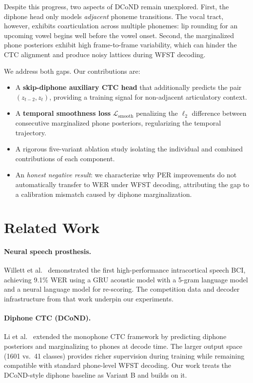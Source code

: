 \documentclass[10pt,twocolumn]{article}
\begin{document}
Despite this progress, two aspects of DCoND remain unexplored.  First,
the diphone head only models \emph{adjacent} phoneme transitions.  The
vocal tract, however, exhibits coarticulation across multiple phonemes:
lip rounding for an upcoming vowel begins well before the vowel onset.
Second, the marginalized phone posteriors exhibit high frame-to-frame
variability, which can hinder the CTC alignment and produce noisy lattices
during WFST decoding.

We address both gaps.  Our contributions are:
\begin{itemize}[leftmargin=1.2em,itemsep=1pt]
  \item A \textbf{skip-diphone auxiliary CTC head} that additionally
    predicts the pair $(z_{t-2}, z_t)$, providing a training signal for
    non-adjacent articulatory context.
  \item A \textbf{temporal smoothness loss} $\mathcal{L}_\text{smooth}$
    penalizing the $\ell_2$ difference between consecutive marginalized
    phone posteriors, regularizing the temporal trajectory.
  \item A rigorous five-variant ablation study isolating the individual
    and combined contributions of each component.
  \item An \emph{honest negative result}: we characterize why PER
    improvements do not automatically transfer to WER under WFST decoding,
    attributing the gap to a calibration mismatch caused by diphone
    marginalization.
\end{itemize}

\section{Related Work}

\paragraph{Neural speech prosthesis.}
Willett et al.~\cite{willett2023} demonstrated the first high-performance
intracortical speech BCI, achieving 9.1\% WER using a GRU acoustic model
with a 5-gram language model and a neural language model for re-scoring.
The competition data and decoder infrastructure from that work underpin our
experiments.

\paragraph{Diphone CTC (DCoND).}
Li et al.~\cite{dcond2024} extended the monophone CTC framework by
predicting diphone posteriors and marginalizing to phones at decode time.
The larger output space (1601 vs.\ 41 classes) provides richer supervision
during training while remaining compatible with standard phone-level WFST
decoding.  Our work treats the DCoND-style diphone baseline as Variant B
and builds on it.
\end{document}
